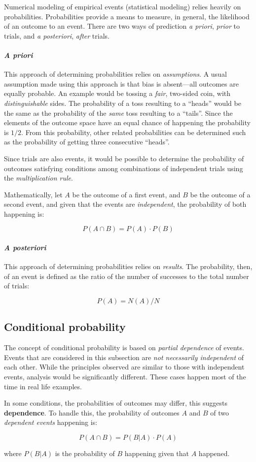Numerical modeling of empirical events (statistical modeling) relies heavily on probabilities.
Probabilities provide a means to measure, in general, the likelihood of an outcome to an event.
There are two ways of prediction \textit{a priori}, \emph{prior} to trials, and \textit{a posteriori}, \emph{after} trials.

\paragraph{\textit{A priori}}
This approach of determining probabilities relies on \emph{assumptions}.
A usual assumption made using this approach is that bias is absent---all outcomes are equally probable.
An example would be tossing a \emph{fair}, two-sided coin, with \emph{distinguishable} sides.
The probability of a toss resulting to a ``heads'' would be the same as the probability of the \emph{same} toss resulting to a ``tails''.
Since the elements of the outcome space have an equal chance of happening the probability is $1/2$.
From this probability, other related probabilities can be determined such as the probability of getting three consecutive ``heads''.

Since trials are also events, it would be possible to determine the probability of outcomes satisfying conditions among combinations of independent trials using the \emph{multiplication rule}.

Mathematically, let $A$ be the outcome of a first event, and $B$ be the outcome of a second event, and given that the events are \emph{independent}, the probability of both happening is:

$$P(A \cap B) = P(A) \cdot P(B)$$

\paragraph{\textit{A posteriori}}
This approach of determining probabilities relies on \emph{results}.
The probability, then, of an event is defined as the ratio of the number of successes to the total number of trials:

$$P(A) = N(A) / N$$

\subsection{Conditional probability}

The concept of conditional probability is based on \emph{partial dependence} of events.
Events that are considered in this subsection are \emph{not necessarily independent} of each other.
While the principles observed are similar to those with independent events, analysis would be significantly different.
These cases happen most of the time in real life examples.

In some conditions, the probabilities of outcomes may differ, this suggests \textbf{dependence}.
To handle this, the probability of outcomes $A$ and $B$ of two \emph{dependent events} happening is:

$$P(A \cap B) = P(B|A) \cdot P(A)$$

where $P(B|A)$ is the probability of $B$ happening given that $A$ happened.
